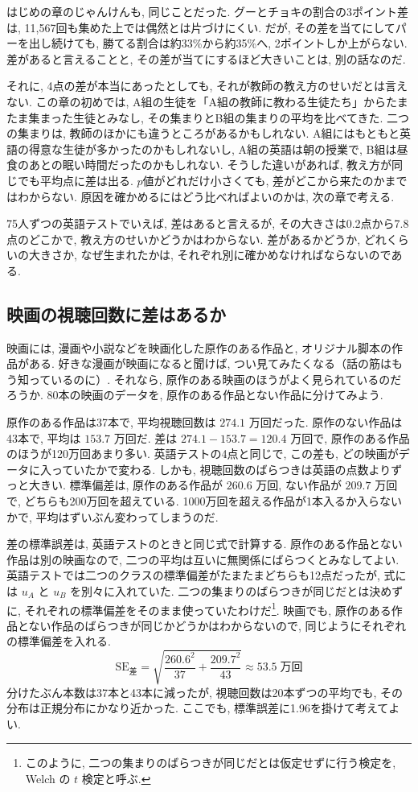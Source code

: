     はじめの章のじゃんけんも, 同じことだった.
    グーとチョキの割合の3ポイント差は, 11{,}567回も集めた上では偶然とは片づけにくい.
    だが, その差を当てにしてパーを出し続けても, 勝てる割合は約33\%から約35\%へ, 2ポイントしか上がらない.
    差があると言えることと, その差が当てにするほど大きいことは, 別の話なのだ.

    それに, 4点の差が本当にあったとしても, それが教師の教え方のせいだとは言えない.
    この章の初めでは, A組の生徒を「A組の教師に教わる生徒たち」からたまたま集まった生徒とみなし, その集まりとB組の集まりの平均を比べてきた.
    二つの集まりは, 教師のほかにも違うところがあるかもしれない.
    A組にはもともと英語の得意な生徒が多かったのかもしれないし, A組の英語は朝の授業で, B組は昼食のあとの眠い時間だったのかもしれない.
    そうした違いがあれば, 教え方が同じでも平均点に差は出る.
    $p$値がどれだけ小さくても, 差がどこから来たのかまではわからない.
    原因を確かめるにはどう比べればよいのかは, 次の章で考える.

    75人ずつの英語テストでいえば, 差はあると言えるが, その大きさは0.2点から7.8点のどこかで, 教え方のせいかどうかはわからない.
    差があるかどうか, どれくらいの大きさか, なぜ生まれたかは, それぞれ別に確かめなければならないのである.

  \subsection{映画の視聴回数に差はあるか}

    映画には, 漫画や小説などを映画化した原作のある作品と, オリジナル脚本の作品がある.
    好きな漫画が映画になると聞けば, つい見てみたくなる（話の筋はもう知っているのに）.
    それなら, 原作のある映画のほうがよく見られているのだろうか.
    80本の映画のデータを, 原作のある作品とない作品に分けてみよう.

    原作のある作品は37本で, 平均視聴回数は $274.1$ 万回だった.
    原作のない作品は43本で, 平均は $153.7$ 万回だ.
    差は $274.1 - 153.7 = 120.4$ 万回で, 原作のある作品のほうが120万回あまり多い.
    英語テストの4点と同じで, この差も, どの映画がデータに入っていたかで変わる.
    しかも, 視聴回数のばらつきは英語の点数よりずっと大きい.
    標準偏差は, 原作のある作品が $260.6$ 万回, ない作品が $209.7$ 万回で, どちらも200万回を超えている.
    1000万回を超える作品が1本入るか入らないかで, 平均はずいぶん変わってしまうのだ.

    差の標準誤差は, 英語テストのときと同じ式で計算する.
    原作のある作品とない作品は別の映画なので, 二つの平均は互いに無関係にばらつくとみなしてよい.
    英語テストでは二つのクラスの標準偏差がたまたまどちらも12点だったが, 式には $u_A$ と $u_B$ を別々に入れていた.
    二つの集まりのばらつきが同じだとは決めずに, それぞれの標準偏差をそのまま使っていたわけだ\footnote{%
    このように, 二つの集まりのばらつきが同じだとは仮定せずに行う検定を, Welch の $t$ 検定と呼ぶ.}.
    映画でも, 原作のある作品とない作品のばらつきが同じかどうかはわからないので, 同じようにそれぞれの標準偏差を入れる.
    \[
      \mathrm{SE}_{\text{差}} = \sqrt{\frac{260.6^2}{37} + \frac{209.7^2}{43}} \approx 53.5\;\text{万回}
    \]
    分けたぶん本数は37本と43本に減ったが, 視聴回数は20本ずつの平均でも, その分布は正規分布にかなり近かった.
    ここでも, 標準誤差に1.96を掛けて考えてよい.

